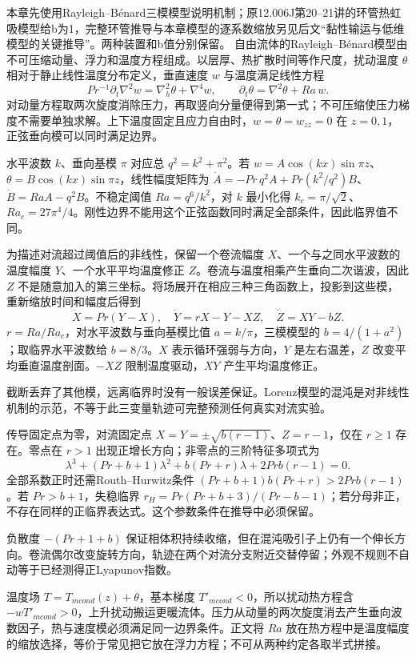 本章先使用Rayleigh--Bénard三模模型说明机制；原12.006J第20--21讲的环管热虹吸模型给b为1，完整环管推导与本章模型的逐系数缩放另见后文“黏性输运与低维模型的关键推导”。两种装置和b值分别保留。
自由流体的Rayleigh--Bénard模型由不可压缩动量、浮力和温度方程组成。以层厚、热扩散时间等作尺度，扰动温度 $\theta$ 相对于静止线性温度分布定义，垂直速度 $w$ 与温度满足线性方程
\[
Pr^{-1}\partial_t\nabla^2w=\nabla_h^2\theta+\nabla^4w,
\qquad \partial_t\theta=\nabla^2\theta+Ra\,w.
\]
对动量方程取两次旋度消除压力，再取竖向分量便得到第一式；不可压缩使压力梯度不需要单独求解。上下温度固定且应力自由时，$w=\theta=w_{zz}=0$ 在 $z=0,1$，正弦垂向模可以同时满足边界。

水平波数 $k$、垂向基模 $\pi$ 对应总 $q^2=k^2+\pi^2$。若 $w=A\cos(kx)\sin\pi z$、$\theta=B\cos(kx)\sin\pi z$，线性幅度矩阵为 $\dot A=-Pr\,q^2A+Pr(k^2/q^2)B$、$\dot B=Ra A-q^2B$。不稳定阈值 $Ra=q^6/k^2$，对 $k$ 最小化得 $k_c=\pi/\sqrt2$、$Ra_c=27\pi^4/4$。刚性边界不能用这个正弦函数同时满足全部条件，因此临界值不同。

为描述对流超过阈值后的非线性，保留一个卷流幅度 $X$、一个与之同水平波数的温度幅度 $Y$、一个水平平均温度修正 $Z$。卷流与温度相乘产生垂向二次谐波，因此 $Z$ 不是随意加入的第三坐标。将场展开在相应三种三角函数上，投影到这些模，重新缩放时间和幅度后得到
\[
\dot X=Pr(Y-X),\quad \dot Y=rX-Y-XZ,\quad \dot Z=XY-bZ.
\]
$r=Ra/Ra_c$，对水平波数与垂向基模比值 $a=k/\pi$，三模模型的 $b=4/(1+a^2)$；取临界水平波数给 $b=8/3$。$X$ 表示循环强弱与方向，$Y$ 是左右温差，$Z$ 改变平均垂直温度剖面。$-XZ$ 限制温度驱动，$XY$ 产生平均温度修正。

截断丢弃了其他模，远离临界时没有一般误差保证。Lorenz模型的混沌是对非线性机制的示范，不等于此三变量轨迹可完整预测任何真实对流实验。

传导固定点为零，对流固定点 $X=Y=\pm\sqrt{b(r-1)}$、$Z=r-1$，仅在 $r\ge1$ 存在。零点在 $r>1$ 出现正增长方向；非零点的三阶特征多项式为
\[
\lambda^3+(Pr+b+1)\lambda^2+b(Pr+r)\lambda+2Prb(r-1)=0.
\]
全部系数正时还需Routh--Hurwitz条件 $(Pr+b+1)b(Pr+r)>2Prb(r-1)$。若 $Pr>b+1$，失稳临界 $r_H=Pr(Pr+b+3)/(Pr-b-1)$；若分母非正，不存在同样的正临界表达式。这个参数条件在推导中必须保留。

负散度 $-(Pr+1+b)$ 保证相体积持续收缩，但在混沌吸引子上仍有一个伸长方向。卷流偶尔改变旋转方向，轨迹在两个对流分支附近交替停留；外观不规则不自动等于已经测得正Lyapunov指数。

温度场 $T=T_{
m cond}(z)+\theta$，基本梯度 $T'_{
m cond}<0$，所以扰动热方程含 $-wT'_{
m cond}>0$，上升扰动搬运更暖流体。压力从动量的两次旋度消去产生垂向波数因子，热与速度模必须满足同一边界条件。正文将 $Ra$ 放在热方程中是温度幅度的缩放选择，等价于常见把它放在浮力方程；不可从两种约定各取半式拼接。

